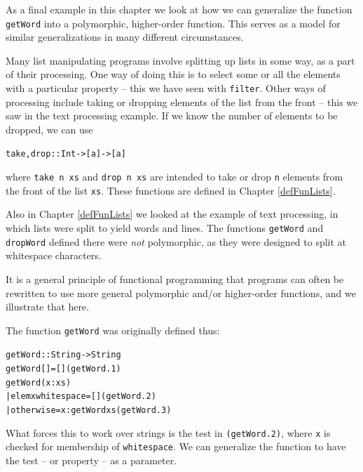 As a final example in this chapter we look at how we can generalize the
function \texttt{getWord} into a polymorphic, higher-order function.
This serves as a model for similar generalizations in many different
circumstances.

Many list manipulating programs involve splitting up lists in some way, as a
part of their processing. One way of doing this is to select some or all the
elements with a particular property -- this we have seen with \texttt{filter}.
Other ways of processing include taking or dropping elements of the list from
the front -- this we saw in the text processing example. If we know the
number of elements to be dropped, we can use
\begin{alltt}
take, drop :: Int -> [a] -> [a]
\end{alltt}
where \texttt{take n xs} and \texttt{drop n xs} are intended to take or drop \texttt{n}
elements from the front of the list \texttt{xs}. These functions are defined in
Chapter \ref{defFunLists}.

Also in Chapter \ref{defFunLists} we looked at the example of text processing, in which
lists were split to yield words and lines. The functions 
\texttt{getWord} and \texttt{dropWord} defined there were {\em not\/} polymorphic, as they
were designed to split at whitespace characters. 

It is a general principle of functional programming that programs can often
be rewritten to use more general polymorphic and/or higher-order functions,
and we illustrate that here. 

The function \texttt{getWord} was originally defined thus:
\begin{alltt}
getWord :: String -> String
getWord []    = [] \hfill(getWord.1)
getWord (x:xs) 
  | elem x whitespace   = []\hfill(getWord.2)
  | otherwise           = x : getWord xs \hfill(getWord.3)
\end{alltt}
What forces this to work over strings is the test in \texttt{(getWord.2)}, where 
\texttt{x}
is checked for membership of \texttt{whitespace}. We can generalize the
function to have the test -- or property -- as a parameter. 

